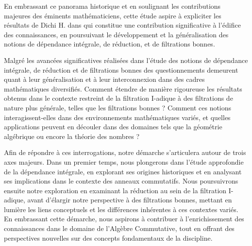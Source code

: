 En embrassant ce panorama historique et en soulignant les contributions majeures des éminents mathématiciens, cette étude aspire à expliciter les résultats de Dichi H. dans \cite{Di2} qui constitue une contribution significative à l'édifice des connaissances, en poursuivant le développement et la généralisation des notions de dépendance intégrale, de réduction, et de filtrations bonnes.

Malgré les avancées significatives réalisées dans l'étude des notions de dépendance intégrale, de réduction et de filtrations bonnes des questionnements demeurent quant à leur généralisation et à leur interconnexion dans des cadres mathématiques diversifiés. Comment étendre de manière rigoureuse les résultats obtenus dans le contexte restreint de la filtration I-adique à des filtrations de nature plus générale, telles que les filtrations bonnes ? Comment ces notions interagissent-elles dans des environnements mathématiques variés, et quelles applications peuvent en découler dans des domaines tels que la géométrie algébrique ou encore la théorie des nombres ? 

Afin de répondre à ces interrogations, notre démarche s'articulera autour de trois axes majeurs. Dans un premier temps, nous plongerons dans l'étude approfondie de la dépendance intégrale, en explorant ses origines historiques et en analysant ses implications dans le contexte des anneaux commutatifs. Nous poursuivrons ensuite notre exploration en examinant la réduction au sein de la filtration I-adique, avant d'élargir notre perspective à des filtrations bonnes, mettant en lumière les liens conceptuels et les différences inhérentes à ces contextes variés. En embrassant cette démarche, nous aspirons à contribuer à l'enrichissement des connaissances dans le domaine de l'Algèbre Commutative, tout en offrant des perspectives nouvelles sur des concepts fondamentaux de la discipline.


